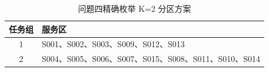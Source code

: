\begin{table}[htbp]
\centering\small
\caption{问题四精确枚举 K=2 分区方案}\label{tab:q4_partition_k2}
\begin{tabular}{cl}
\toprule 任务组 & 服务区 \\\midrule
1 & S001、S002、S003、S009、S012、S013 \\
2 & S004、S005、S006、S007、S015、S008、S011、S010、S014 \\\bottomrule\end{tabular}\end{table}
